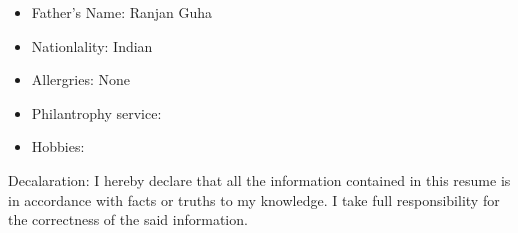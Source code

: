 \vspace{10mm}

\begin{itemize}
    \item Father's Name: Ranjan Guha
    \item Nationlality: Indian
    \item Allergries: None
    \item Philantrophy service: 
    \item Hobbies:
\end{itemize}

\vspace{7mm}


\begin{justify}
    Decalaration:\newline
    I hereby declare that all the information contained in this resume is in accordance with facts or truths to my knowledge. I take full responsibility for the correctness of the said information.
\end{justify}
